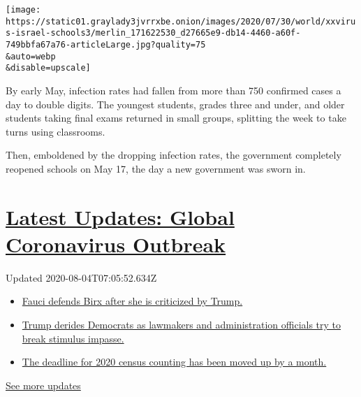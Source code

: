 \texttt{[image: https://static01.graylady3jvrrxbe.onion/images/2020/07/30/world/xxvirus-israel-schools3/merlin\_171622530\_d27665e9-db14-4460-a60f-749bbfa67a76-articleLarge.jpg?quality=75\\\&auto=webp\\\&disable=upscale]}

By early May, infection rates had fallen from more than 750 confirmed
cases a day to double digits. The youngest students, grades three and
under, and older students taking final exams returned in small groups,
splitting the week to take turns using classrooms.

Then, emboldened by the dropping infection rates, the government
completely reopened schools on May 17, the day a new government was
sworn in.

\hypertarget{latest-updates-global-coronavirus-outbreak}{%
\section{\texorpdfstring{\href{https://www.nytimes3xbfgragh.onion/2020/08/03/world/coronavirus-covid-19.html?action=click\&pgtype=Article\&state=default\&region=MAIN_CONTENT_1\&context=storylines_live_updates}{Latest
Updates: Global Coronavirus
Outbreak}}{Latest Updates: Global Coronavirus Outbreak}}\label{latest-updates-global-coronavirus-outbreak}}

Updated 2020-08-04T07:05:52.634Z

\begin{itemize}
\tightlist
\item
  \href{https://www.nytimes3xbfgragh.onion/2020/08/03/world/coronavirus-covid-19.html?action=click\&pgtype=Article\&state=default\&region=MAIN_CONTENT_1\&context=storylines_live_updates\#link-4547638f}{Fauci
  defends Birx after she is criticized by Trump.}
\item
  \href{https://www.nytimes3xbfgragh.onion/2020/08/03/world/coronavirus-covid-19.html?action=click\&pgtype=Article\&state=default\&region=MAIN_CONTENT_1\&context=storylines_live_updates\#link-15e7f995}{Trump
  derides Democrats as lawmakers and administration officials try to
  break stimulus impasse.}
\item
  \href{https://www.nytimes3xbfgragh.onion/2020/08/03/world/coronavirus-covid-19.html?action=click\&pgtype=Article\&state=default\&region=MAIN_CONTENT_1\&context=storylines_live_updates\#link-e5a2cda}{The
  deadline for 2020 census counting has been moved up by a month.}
\end{itemize}

\href{https://www.nytimes3xbfgragh.onion/2020/08/03/world/coronavirus-covid-19.html?action=click\&pgtype=Article\&state=default\&region=MAIN_CONTENT_1\&context=storylines_live_updates}{See
more updates}

